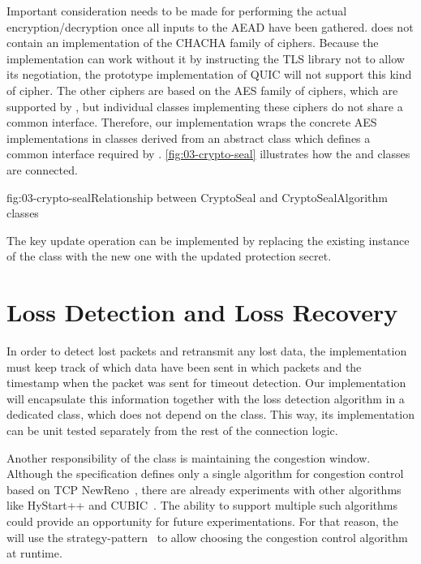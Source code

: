 Important consideration needs to be made for performing the actual encryption/decryption once all
inputs to the AEAD have been gathered. \dotnet{} does not contain an implementation of the CHACHA
family of ciphers. Because the implementation can work without it by instructing the TLS library not
to allow its negotiation, the prototype implementation of QUIC will not support this kind of cipher.
The other ciphers are based on the AES family of ciphers, which are supported by \dotnet{}, but
individual classes implementing these ciphers do not share a common interface. Therefore, our
implementation wraps the concrete AES implementations in classes derived from an abstract
 class which defines a common interface required by \CryptoSeal{}.
\autoref{fig:03-crypto-seal} illustrates how the \CryptoSeal{} and 
classes are connected.

\begin{myFigure}{fig:03-crypto-seal}{Relationship between CryptoSeal and CryptoSealAlgorithm
classes}

  \resizebox{\linewidth}{!}{}

\end{myFigure}

The key update operation can be implemented by replacing the existing instance of the \CryptoSeal{}
class with the new one with the updated protection secret.

\section{Loss Detection and Loss Recovery}

In order to detect lost packets and retransmit any lost data, the \QuicConnection{} implementation
must keep track of which data have been sent in which packets and the timestamp when the packet was
sent for timeout detection. Our implementation will encapsulate this information together with the
loss detection algorithm in a dedicated \RecoveryController{} class, which does not depend on the
\QuicConnection{} class. This way, its implementation can be unit tested separately from the rest of
the connection logic.

Another responsibility of the \RecoveryController{} class is maintaining the congestion window.
Although the specification defines only a single algorithm for congestion control based on TCP
NewReno~\cite[Section~7]{draft-ietf-quic-recovery}, there are already experiments with other
algorithms like HyStart++ and CUBIC~\cite{cloudflareCubic}. The ability to support multiple such
algorithms could provide an opportunity for future experimentations. For that reason, the
\RecoveryController{} will use the \gls{strategy-pattern}~\cite{wiki:strategy-pattern} to allow
choosing the congestion control algorithm at runtime.

